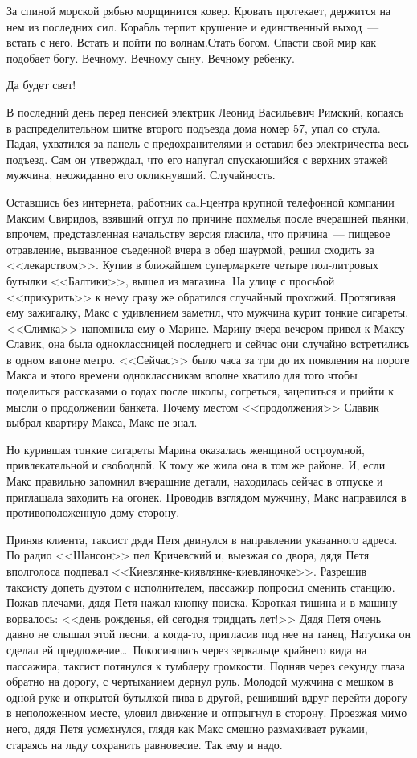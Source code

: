 За спиной морской рябью морщинится ковер. Кровать протекает, держится на нем из 
последних сил. Корабль терпит крушение и единственный выход~--- встать с него. 
Встать и пойти по волнам.Стать богом. Спасти свой мир как подобает богу. 
Вечному. Вечному сыну. Вечному ребенку.

Да будет свет!

В последний день перед пенсией электрик Леонид Васильевич Римский, копаясь в 
распределительном щитке второго подъезда дома номер 57, упал со стула. Падая, 
ухватился за панель с предохранителями и оставил без электричества весь 
подъезд. Сам он утверждал, что его напугал спускающийся с верхних этажей мужчина, 
неожиданно его окликнувший. Случайность.

Оставшись без интернета, работник call-центра крупной телефонной компании 
Максим Свиридов, взявший отгул по причине похмелья после вчерашней пьянки, впрочем, 
представленная начальству версия гласила, что причина~--- пищевое отравление, 
вызванное съеденной вчера в обед шаурмой, решил сходить за <<лекарством>>. 
Купив в ближайшем супермаркете четыре пол-литровых бутылки <<Балтики>>, вышел из 
магазина. На улице с просьбой <<прикурить>> к нему сразу же обратился случайный прохожий. 
Протягивая ему зажигалку, Макс с удивлением заметил, что мужчина курит тонкие 
сигареты. <<Слимка>> напомнила ему о Марине. Марину вчера вечером привел к 
Максу Славик, она была одноклассницей последнего и сейчас они случайно встретились в 
одном вагоне метро. <<Сейчас>> было часа за три до их появления на пороге Макса 
и этого времени одноклассникам вполне хватило для того чтобы поделиться 
рассказами о годах после школы, согреться, зацепиться и прийти к мысли о продолжении 
банкета. Почему местом <<продолжения>> Славик выбрал квартиру Макса, Макс не 
знал. 

Но курившая тонкие сигареты Марина оказалась женщиной остроумной, 
привлекательной и свободной. К тому же жила она в том же районе. И, если Макс 
правильно запомнил вчерашние детали, находилась сейчас в отпуске и приглашала 
заходить на огонек. Проводив взглядом мужчину, Макс направился в 
противоположенную дому сторону.

Приняв клиента, таксист дядя Петя двинулся в направлении указанного адреса. По 
радио <<Шансон>> пел Кричевский и, выезжая со двора, дядя Петя вполголоса 
подпевал <<Киевлянке-киявлянке-киевляночке>>. Разрешив таксисту допеть дуэтом с 
исполнителем, пассажир попросил сменить станцию. Пожав плечами, дядя Петя нажал 
кнопку поиска. Короткая тишина и в машину ворвалось: << день 
рожденья, ей сегодня тридцать лет!>> Дядя Петя очень давно не слышал этой песни, а 
когда-то, пригласив под нее на танец, Натусика он сделал ей предложение\ldots\
Покосившись через зеркальце крайнего вида на пассажира, таксист потянулся к 
тумблеру громкости. Подняв через секунду глаза обратно на дорогу, с чертыханием 
дернул руль. Молодой мужчина с мешком в одной руке и открытой бутылкой пива в 
другой, решивший вдруг перейти дорогу в неположенном месте, уловил движение и 
отпрыгнул в сторону. Проезжая мимо него, дядя Петя усмехнулся, глядя как Макс 
смешно размахивает руками, стараясь на льду сохранить равновесие. Так ему и 
надо.

